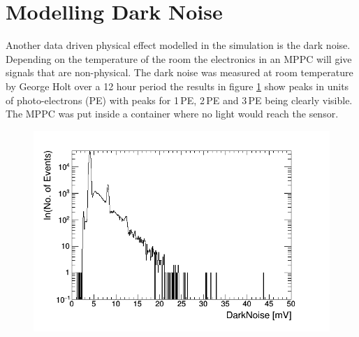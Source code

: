 \section{Modelling Dark Noise}\label{sec:geant4Simulation_ModellingDarkNoise}
Another data driven physical effect modelled in the simulation is the dark noise. Depending on the temperature of the room the electronics in an MPPC will give signals that are non-physical. The dark noise was measured at room temperature by George Holt over a 12 hour period the results in figure \ref{fig:pureDarkNoise} show peaks in units of photo-electrons (PE) with peaks for 1\,PE, 2\,PE and 3\,PE being clearly visible. The MPPC was put inside a container where no light would reach the sensor. 
\begin{figure}[htbp]
 \centering
 \includegraphics[width=0.8\linewidth]{pureDarkNoise_output.png}
 \label{fig:pureDarkNoise}
\end{figure}

